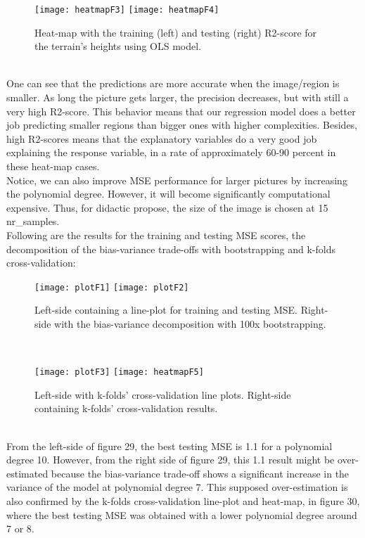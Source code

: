 \begin{figure}[H]
\label{fig:heatmapF3and4}
\centering
\texttt{[image: heatmapF3]}
\texttt{[image: heatmapF4]}
\caption{Heat-map with the training (left) and testing (right) R2-score for the terrain's heights using OLS model.}
\end{figure}\\

One can see that the predictions are more accurate when the image/region is smaller. As long the picture gets larger, the precision decreases, but with still a very high R2-score. This behavior means that our regression model does a better job predicting smaller regions than bigger ones with higher complexities. Besides, high R2-scores means that the explanatory variables do a very good job explaining the response variable, in a rate of approximately 60-90 percent in these heat-map cases.\\

Notice, we can also improve MSE performance for larger pictures by increasing the polynomial degree. However, it will become significantly computational expensive. Thus, for didactic propose, the size of the image is chosen at 15 nr\_samples.\\

Following are the results for the training and testing MSE scores, the decomposition of the bias-variance trade-offs with bootstrapping and k-folds cross-validation:\\

\begin{figure}[H]
\label{fig:plotF1andF2}
\centering
\texttt{[image: plotF1]}
\texttt{[image: plotF2]}
\caption{Left-side containing a line-plot for training and testing MSE. Right-side with the bias-variance decomposition with 100x bootstrapping.}
\end{figure}\\

\begin{figure}[H]
\label{fig:plotF3andH5}
\centering
\texttt{[image: plotF3]}
\texttt{[image: heatmapF5]}
\caption{Left-side with k-folds' cross-validation line plots. Right-side containing k-folds' cross-validation results.}
\end{figure}\\

From the left-side of figure 29, the best testing MSE is 1.1 for a polynomial degree 10. However, from the right side of figure 29, this 1.1 result might be over-estimated because the bias-variance trade-off shows a significant increase in the variance of the model at polynomial degree 7. This supposed over-estimation is also confirmed by the k-folds cross-validation line-plot and heat-map, in figure 30, where the best testing MSE was obtained with a lower polynomial degree around 7 or 8. \\


